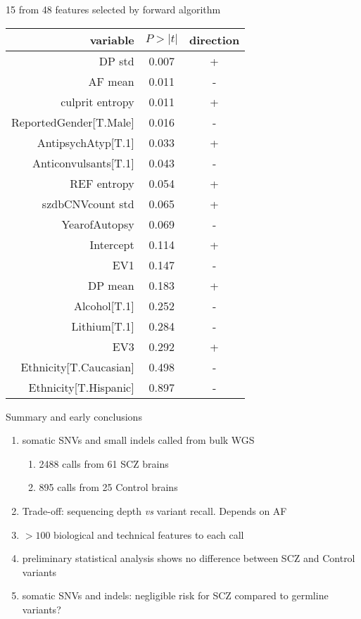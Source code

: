 \documentclass{beamer}
\begin{document}
\begin{frame}{15 from 48 features selected by forward algorithm}
\tiny
\begin{tabular}{rcc}
	variable & \(P>|t|\) & direction \\
\hline
DP std & 0.007 & + \\
AF mean & 0.011 & - \\
culprit entropy & 0.011 & + \\
ReportedGender[T.Male] & 0.016 & - \\
AntipsychAtyp[T.1] & 0.033 & + \\
Anticonvulsants[T.1] & 0.043 & - \\
REF entropy & 0.054 & + \\
szdbCNVcount std & 0.065 & + \\
YearofAutopsy & 0.069 & - \\
Intercept & 0.114 & + \\
EV1 & 0.147 & - \\
DP mean & 0.183 & + \\
Alcohol[T.1] & 0.252 & - \\
Lithium[T.1] & 0.284 & - \\
EV3 & 0.292 & + \\
Ethnicity[T.Caucasian] & 0.498 & - \\
Ethnicity[T.Hispanic] & 0.897 & - \\
\end{tabular}
\end{frame}

\begin{frame}{Summary and early conclusions}
\begin{enumerate}
\item somatic SNVs and small indels called from bulk WGS 
\begin{enumerate}
\item 2488 calls from 61 SCZ brains
\item 895 calls from 25 Control brains
\end{enumerate}
\item Trade-off: sequencing depth \emph{vs} variant recall. Depends on AF
\item \(> 100\) biological and technical features to each call
\item preliminary statistical analysis shows no difference between SCZ and Control variants
\item somatic SNVs and indels: negligible risk for SCZ compared to germline variants?
\end{enumerate}
\end{frame}
\end{document}
